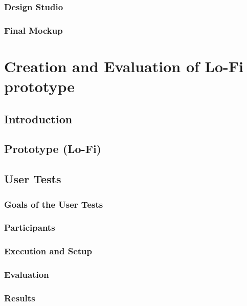 \documentclass[11pt]{report}
\begin{document}
\subsection{Design Studio}

\subsection{Final Mockup}

\chapterfont{\LARGE \centering}
\chaptertitlefont{\Large \centering}
\chapter{Creation and Evaluation of  Lo-Fi prototype}

\section{Introduction}

\section{Prototype (Lo-Fi)}

\section{User Tests}

\subsection{Goals of the User Tests}

\subsection{Participants}

\subsection{Execution and Setup}

\subsection{Evaluation}

\subsection{Results}
\end{document}
